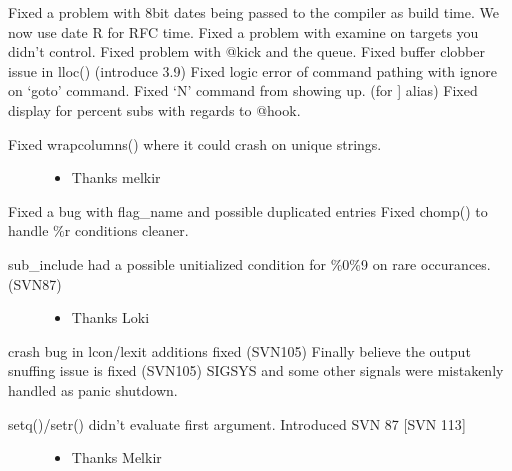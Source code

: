 \documentclass[letterpaper,10pt,english]{sphinxmanual}
\begin{document}
\sphinxAtStartPar
Fixed a problem with 8\sphinxhyphen{}bit dates being passed to the compiler as build time. We now use date \sphinxhyphen{}R for RFC time.
Fixed a problem with examine on targets you didn’t control.
Fixed problem with @kick and the queue.
Fixed buffer clobber issue in lloc() (introduce 3.9)
Fixed logic error of command pathing with ignore on ‘goto’ command.
Fixed ‘N’ command from showing up. (for {]} alias)
Fixed display for percent subs with regards to @hook.
\begin{description}
\item[{Fixed wrapcolumns() where it could crash on unique strings.}] \leavevmode\begin{itemize}
\item {} 
\sphinxAtStartPar
Thanks melkir

\end{itemize}

\end{description}

\sphinxAtStartPar
Fixed a bug with flag\_name and possible duplicated entries
Fixed chomp() to handle \%r conditions cleaner.
\begin{description}
\item[{sub\_include had a possible unitialized condition for \%0\sphinxhyphen{}\%9 on rare occurances. (SVN\sphinxhyphen{}87)}] \leavevmode\begin{itemize}
\item {} 
\sphinxAtStartPar
Thanks Loki

\end{itemize}

\end{description}

\sphinxAtStartPar
crash bug in lcon/lexit additions \sphinxhyphen{} fixed (SVN\sphinxhyphen{}105)
Finally believe the output snuffing issue is fixed (SVN\sphinxhyphen{}105)
SIGSYS and some other signals were mistakenly handled as panic shutdown.
\begin{description}
\item[{setq()/setr() didn’t evaluate first argument.  Introduced SVN 87 {[}SVN 113{]}}] \leavevmode\begin{itemize}
\item {} 
\sphinxAtStartPar
Thanks Melkir

\end{itemize}

\end{description}
\end{document}

